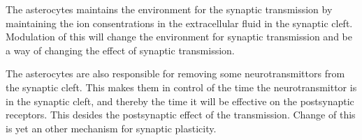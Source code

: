 The asterocytes maintains the environment for the synaptic transmission by maintaining the ion consentrations in the extracellular fluid in the synaptic cleft. 
Modulation of this will change the environment for synaptic transmission and be a way of changing the effect of synaptic transmission. 

The asterocytes are also responsible for removing some neurotransmittors from the synaptic cleft. 
This makes them in control of the time the neurotransmittor is in the synaptic cleft, and thereby the time it will be effective on the postsynaptic receptors.
This desides the postsynaptic effect of the transmission. Change of this is yet an other mechanism for synaptic plasticity.



